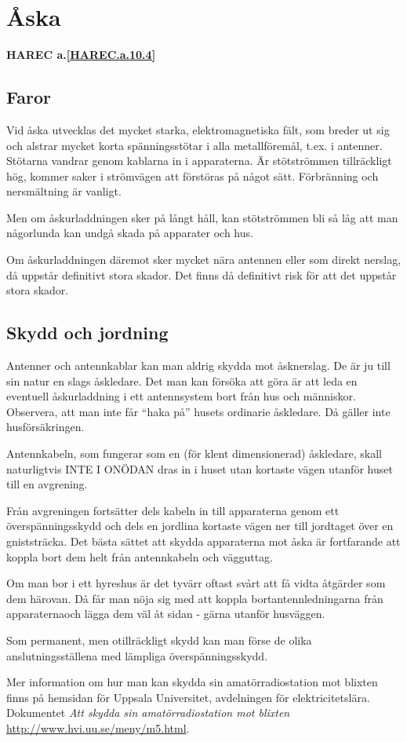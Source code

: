 \section{Åska}
\textbf{
HAREC a.\ref{HAREC.a.10.4}\label{myHAREC.a.10.4}
}

\subsection{Faror}

Vid åska utvecklas det mycket starka, elektromagnetiska fält, som
breder ut sig och alstrar mycket korta spänningsstötar i alla
metallföremål, t.ex. i antenner. Stötarna vandrar genom kablarna in i
apparaterna. Är stötströmmen tillräckligt hög, kommer saker i
strömvägen att förstöras på något sätt.  Förbränning och nersmältning
är vanligt.

Men om åskurladdningen sker på långt håll, kan stötströmmen bli så låg att
man någorlunda kan undgå skada på apparater och hus.

Om åskurladdningen däremot sker mycket nära antennen eller som direkt nerslag,
då uppstår definitivt stora skador. Det finns då definitivt risk för att
det uppstår stora skador.

\subsection{Skydd och jordning}

Antenner och antennkablar kan man aldrig skydda mot åsknerslag. De är
ju till sin natur en slags åskledare. Det man kan försöka att göra är
att leda en eventuell åskurladdning i ett antennsystem bort från hus
och människor. Observera, att man inte får ``haka på'' husets
ordinarie åskledare. Då gäller inte husförsäkringen.

Antennkabeln, som fungerar som en (för klent dimensionerad) åskledare,
skall naturligtvis INTE I ONÖDAN dras in i huset utan kortaste vägen
utanför huset till en avgrening.

Från avgreningen fortsätter dels kabeln in till apparaterna genom ett
överspänningsskydd och dels en jordlina kortaste vägen ner till
jordtaget över en gniststräcka. Det bästa sättet att skydda
apparaterna mot åska är fortfarande att koppla bort dem helt från
antennkabeln och vägguttag.

Om man bor i ett hyreshus är det tyvärr oftast svårt att få vidta
åtgärder som dem härovan. Då får man nöja sig med att koppla
bortantennledningarna från apparaternaoch lägga dem väl åt sidan -
gärna utanför husväggen.

Som permanent, men otillräckligt skydd kan man förse de olika
anslutningsställena med lämpliga överspänningsskydd.

Mer information om hur man kan skydda sin amatörradiostation mot blixten
finns på hemsidan för Uppsala Universitet, avdelningen för elektricitetslära.
Dokumentet \emph{Att skydda sin amatörradiostation mot blixten}
\url{http://www.hvi.uu.se/meny/m5.html}.

